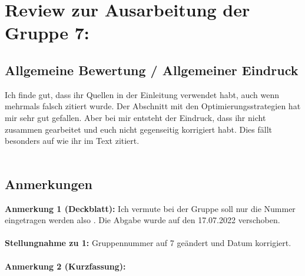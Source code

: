 \documentclass[a4paper,12pt]{book}
\begin{document}
\chapter*{Review zur Ausarbeitung der Gruppe 7:}
\section*{Allgemeine Bewertung / Allgemeiner Eindruck}
Ich finde gut, dass ihr Quellen in der Einleitung verwendet habt, auch wenn mehrmals falsch zitiert wurde. 
Der Abschnitt mit den Optimierungsstrategien hat mir sehr gut gefallen.
Aber bei mir entsteht der Eindruck, dass ihr nicht zusammen gearbeitet und euch nicht gegenseitig korrigiert habt. Dies fällt besonders auf wie ihr im Text zitiert. 
\\ \\
\section*{Anmerkungen}
\textbf{Anmerkung 1 (Deckblatt):}
Ich vermute bei der Gruppe soll nur die Nummer eingetragen werden also \grqq.
Die Abgabe wurde auf den 17.07.2022 verschoben.
\\ \\
\textbf{Stellungnahme zu 1:} 
Gruppennummer auf 7 geändert und Datum korrigiert.
\\ \\
\textbf{Anmerkung 2 (Kurzfassung):} 
\end{document}
